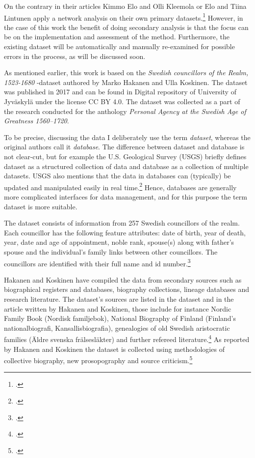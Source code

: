 On the contrary in their articles Kimmo Elo and Olli Kleemola or Elo and Tiina Lintunen apply a network analysis on their own primary datasets.\footcites{eloAklee15}{LintunenAndElo2019} However, in the case of this work the benefit of doing secondary analysis is that the focus can be on the implementation and assessment of the method. Furthermore, the existing dataset will be automatically and manually re-examined for possible errors in the process, as will be discussed soon. 

As mentioned earlier, this work is based on the \textit{Swedish councillors of the Realm, 1523-1680} -dataset authored by Marko Hakanen and Ulla Koskinen. The dataset was published in 2017 and can be found in Digital repository of University of Jyväskylä under the license CC BY 4.0. The dataset was collected as a part of the research conducted for the anthology \textit{Personal Agency at the Swedish Age of Greatness 1560–1720}.

To be precise, discussing the data I deliberately use the term \textit{dataset}, whereas the original authors call it \textit{database}. The difference between dataset and database is not clear-cut, but for example the U.S. Geological Survey (USGS) briefly defines dataset as a structured collection of data and database as a collection of multiple datasets. USGS also mentions that the data in databases can (typically) be updated and manipulated easily in real time.\footcite{usgs} Hence, databases are generally more complicated interfaces for data management, and for this purpose the term dataset is more suitable.

The dataset consists of information from 257 Swedish councillors of the realm. Each councillor has the following feature attributes: date of birth, year of death, year, date and age of appointment, noble rank, spouse(s) along with father's spouse and the individual's family links between other councillors. The councillors are identified with their full name and id number.\footcites[p. 48.]{HakanenAKoskinen2017}{councillorsDS}

Hakanen and Koskinen have compiled the data from secondary sources such as biographical registers and databases, biography collections, lineage databases and research literature. The dataset's sources are listed in the dataset and in the article written by Hakanen and Koskinen, those include for instance Nordic Family Book (Nordisk familjebok), National Biography of Finland (Finland's nationalbiografi, Kansallisbiografia), genealogies of old Swedish aristocratic families (Äldre svenska frälsesläkter) and further refereed literature.\footcites[p. 48, 76]{HakanenAKoskinen2017}{councillorsDS} As reported by Hakanen and Koskinen the dataset is collected using methodologies of collective biography, new prosopography and source criticism.\footcite[p. 48.]{HakanenAKoskinen2017}
  
